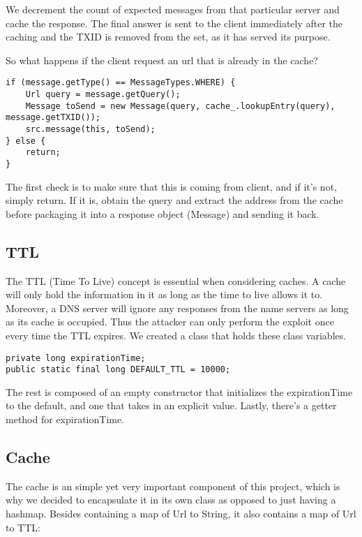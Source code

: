 \documentclass[a4paper, 12pt]{article} %
\begin{document}
We decrement the count of expected messages from that particular server and cache the response. The final answer is sent to the client immediately after the caching and the TXID is removed from the set, as it has served its purpose.

So what happens if the client request an url that is already in the cache?

\begin{lstlisting}
if (message.getType() == MessageTypes.WHERE) {
    Url query = message.getQuery();
    Message toSend = new Message(query, cache_.lookupEntry(query), message.getTXID());
    src.message(this, toSend);
} else {
    return;
}
\end{lstlisting}

The first check is to make sure that this is coming from  client, and if it’s not, simply return. If it is, obtain the query and extract the address from the cache before packaging it into a response object (Message) and sending it back.

\subsection*{TTL}

The TTL (Time To Live) concept is essential when considering caches. A cache will only hold the information in it as long as the time to live allows it to. Moreover, a DNS server will ignore any responses from the name servers as long as its cache is occupied. Thus the attacker can only perform the exploit once every time the TTL expires. We created a class that holds these class variables. 

\begin{lstlisting}
private long expirationTime;
public static final long DEFAULT_TTL = 10000;
\end{lstlisting}

The rest is composed of an empty constructor that initializes the expirationTime to the default, and one that takes in an explicit value. Lastly, there’s a getter method for expirationTime. 

\subsection*{Cache}

The cache is an simple yet very important component of this project, which is why we decided to encapsulate it in its own class as opposed to just having a hashmap. Besides containing a map of Url to String, it also contains a map of Url to TTL:
\end{document}
